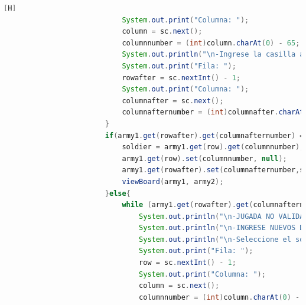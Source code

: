 \documentclass{article}
\begin{document}
\begin{lstlisting}[language=java,caption={Las lineas de codigos del metodo creado:}][H]
							System.out.print("Columna: ");
							column = sc.next();
							columnnumber = (int)column.charAt(0) - 65; 
							System.out.println("\n-Ingrese la casilla a mover");
							System.out.print("Fila: ");
							rowafter = sc.nextInt() - 1;
							System.out.print("Columna: ");
							columnafter = sc.next();
							columnafternumber = (int)columnafter.charAt(0) - 65;  
						}
						if(army1.get(rowafter).get(columnafternumber) == null && army2.get(rowafter).get(columnafternumber) == null){
							soldier = army1.get(row).get(columnnumber);
							army1.get(row).set(columnnumber, null);
							army1.get(rowafter).set(columnafternumber,soldier);
							viewBoard(army1, army2);
						}else{
							while (army1.get(rowafter).get(columnafternumber) != null){
								System.out.println("\n-JUGADA NO VALIDA");
								System.out.println("\n-INGRESE NUEVOS DATOS");
								System.out.println("\n-Seleccione el soldado: ");
								System.out.print("Fila: ");
								row = sc.nextInt() - 1;
								System.out.print("Columna: ");
								column = sc.next();
								columnnumber = (int)column.charAt(0) - 65; 
	

\end{lstlisting}
\end{document}
